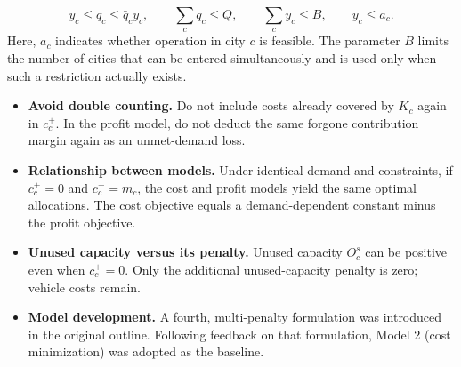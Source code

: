 \documentclass[10pt,a4paper]{article}
\newcommand{\block}[1]{\vspace{6pt}{\large\bfseries #1}\par\vspace{2pt}}
\begin{document}
\block{4. Common Constraints and Subsequent Revisions}
\[
y_c\le q_c\le\bar q_c y_c,\qquad
\sum_c q_c\le Q,\qquad
\sum_c y_c\le B,\qquad y_c\le a_c.
\]
Here, $a_c$ indicates whether operation in city $c$ is feasible.
The parameter $B$ limits the number of cities that can be entered simultaneously and is used only when such a restriction actually exists.

\block{5. Key Interpretation Notes}
\begin{itemize}
\item \textbf{Avoid double counting.} Do not include costs already covered by $K_c$ again in $c_c^+$. In the profit model, do not deduct the same forgone contribution margin again as an unmet-demand loss.
\item \textbf{Relationship between models.} Under identical demand and constraints, if $c_c^+=0$ and $c_c^-=m_c$, the cost and profit models yield the same optimal allocations. The cost objective equals a demand-dependent constant minus the profit objective.
\item \textbf{Unused capacity versus its penalty.} Unused capacity $O_c^s$ can be positive even when $c_c^+=0$. Only the additional unused-capacity penalty is zero; vehicle costs remain.
\item \textbf{Model development.} A fourth, multi-penalty formulation was introduced in the original outline. Following feedback on that formulation, Model 2 (cost minimization) was adopted as the baseline.
\end{itemize}
\end{document}
